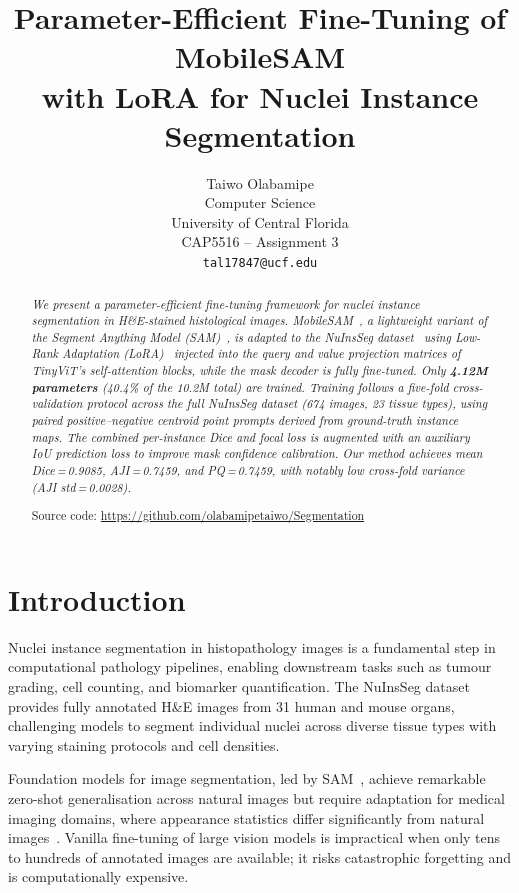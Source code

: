 \documentclass[10pt,twocolumn]{article}
\title{\textbf{Parameter-Efficient Fine-Tuning of MobileSAM\\
with LoRA for Nuclei Instance Segmentation}}
\author{
  Taiwo Olabamipe \\
  Computer Science \\
  University of Central Florida \\
  CAP5516 -- Assignment 3 \\
  \texttt{tal17847@ucf.edu}
}
\date{}
\begin{document}
\maketitle

\begin{abstract}
\textit{
We present a parameter-efficient fine-tuning framework for nuclei
instance segmentation in H\&E-stained histological images.
MobileSAM~\cite{zhang2023mobilesam}, a lightweight variant of the
Segment Anything Model (SAM)~\cite{kirillov2023sam}, is adapted
to the NuInsSeg dataset~\cite{mahbod2024nuinsseg} using Low-Rank
Adaptation (LoRA)~\cite{hu2021lora} injected into the query and
value projection matrices of TinyViT's self-attention blocks,
while the mask decoder is fully fine-tuned. Only \textbf{4.12M
parameters} (40.4\% of the 10.2M total) are trained. Training
follows a five-fold cross-validation protocol across the full
NuInsSeg dataset (674 images, 23 tissue types), using paired
positive--negative centroid point prompts derived from ground-truth
instance maps. The combined per-instance Dice and focal loss is
augmented with an auxiliary IoU prediction loss to improve mask
confidence calibration. Our method achieves mean
Dice\,=\,0.9085, AJI\,=\,0.7459, and PQ\,=\,0.7459, with
notably low cross-fold variance (AJI std\,=\,0.0028).
}

\medskip
Source code: \url{https://github.com/olabamipetaiwo/Segmentation}
\end{abstract}

\section{Introduction}

Nuclei instance segmentation in histopathology images is a
fundamental step in computational pathology pipelines, enabling
downstream tasks such as tumour grading, cell counting, and
biomarker quantification. The NuInsSeg dataset~\cite{mahbod2024nuinsseg}
provides fully annotated H\&E images from 31 human and mouse
organs, challenging models to segment individual nuclei across
diverse tissue types with varying staining protocols and cell
densities.

Foundation models for image segmentation, led by
SAM~\cite{kirillov2023sam}, achieve remarkable zero-shot
generalisation across natural images but require adaptation for
medical imaging domains, where appearance statistics differ
significantly from natural images~\cite{mazurowski2023sam}.
Vanilla fine-tuning of large vision models is impractical when
only tens to hundreds of annotated images are available; it risks
catastrophic forgetting and is computationally expensive.
\end{document}
